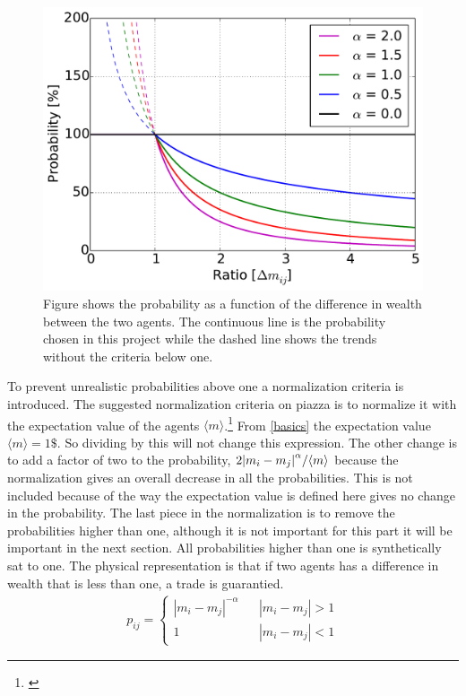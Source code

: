 \begin{figure}[H]
\centering
\includegraphics[width=0.7\linewidth]{theory/bilder/difference}
\caption{Figure shows the probability as a function of the difference in wealth between the two agents. The continuous line is the probability chosen in this project while the dashed line shows the trends without the criteria below one.}
\label{fig:difference}
\end{figure}


To prevent unrealistic probabilities above one a normalization criteria is introduced. The suggested normalization criteria on piazza is to normalize it with the expectation value of the agents $\langle m\rangle$.\footnote{\href{https://piazza.com/class/j6owewp05ym46p?cid=126}{\color{blue}{Piazza: Morten's suggestion} }} From \ref{basics} the expectation value $\langle m\rangle=1\$$. So dividing by this will not change this expression. The other change is to add a factor of two to the probability, $2\abs{m_i-m_j}^\alpha/\langle m\rangle$ because the normalization gives an overall decrease in all the probabilities. This is not included because of the way the expectation value is defined here gives no change in the probability. The last piece in the normalization is to remove the probabilities higher than one, although it is not important for this part it will be important in the next section. All probabilities higher than one is synthetically sat to one. The physical representation is that if two agents has a difference in wealth that is less than one, a trade is guarantied.\\

\begin{align} 
p_{ij}=
\left\{\begin{matrix}
|m_i-m_j|^{-\alpha} && |m_i-m_j|>1 \\ 
1 &&|m_i-m_j|<1
\end{matrix}\right.\label{eq:EPICPROB1}
\end{align}

